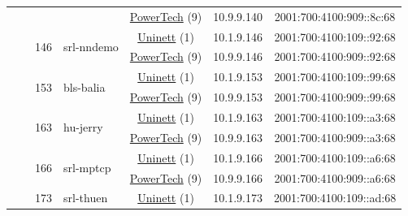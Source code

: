 \begin{small}
\begin{center}
\begin{longtable}{|c|c|c|c|c|c|c|c|}
  &  &  &  & \multicolumn{2}{|c|}{\tiny{\href{http://www.powertech.no}{PowerTech} (9)}} & \tiny{10.9.9.140} & \tiny{2001:700:4100:909::8c:68} \\* \cline{3-3}\cline{4-4}\cline{5-5}\cline{6-6}\cline{7-7}\cline{8-8}
  &  & \multirow{2}{*}{\tiny{146}} & \multicolumn{1}{|l|}{\multirow{2}{*}{\tiny{srl-nndemo}}} & \multicolumn{2}{|c|}{\tiny{\href{https://www.uninett.no}{Uninett} (1)}} & \tiny{10.1.9.146} & \tiny{2001:700:4100:109::92:68} \\* \cline{5-5}\cline{6-6}\cline{7-7}\cline{8-8}
  &  &  &  & \multicolumn{2}{|c|}{\tiny{\href{http://www.powertech.no}{PowerTech} (9)}} & \tiny{10.9.9.146} & \tiny{2001:700:4100:909::92:68} \\* \cline{3-3}\cline{4-4}\cline{5-5}\cline{6-6}\cline{7-7}\cline{8-8}
  &  & \multirow{2}{*}{\tiny{153}} & \multicolumn{1}{|l|}{\multirow{2}{*}{\tiny{bls-balia}}} & \multicolumn{2}{|c|}{\tiny{\href{https://www.uninett.no}{Uninett} (1)}} & \tiny{10.1.9.153} & \tiny{2001:700:4100:109::99:68} \\* \cline{5-5}\cline{6-6}\cline{7-7}\cline{8-8}
  &  &  &  & \multicolumn{2}{|c|}{\tiny{\href{http://www.powertech.no}{PowerTech} (9)}} & \tiny{10.9.9.153} & \tiny{2001:700:4100:909::99:68} \\* \cline{3-3}\cline{4-4}\cline{5-5}\cline{6-6}\cline{7-7}\cline{8-8}
  &  & \multirow{2}{*}{\tiny{163}} & \multicolumn{1}{|l|}{\multirow{2}{*}{\tiny{hu-jerry}}} & \multicolumn{2}{|c|}{\tiny{\href{https://www.uninett.no}{Uninett} (1)}} & \tiny{10.1.9.163} & \tiny{2001:700:4100:109::a3:68} \\* \cline{5-5}\cline{6-6}\cline{7-7}\cline{8-8}
  &  &  &  & \multicolumn{2}{|c|}{\tiny{\href{http://www.powertech.no}{PowerTech} (9)}} & \tiny{10.9.9.163} & \tiny{2001:700:4100:909::a3:68} \\* \cline{3-3}\cline{4-4}\cline{5-5}\cline{6-6}\cline{7-7}\cline{8-8}
  &  & \multirow{2}{*}{\tiny{166}} & \multicolumn{1}{|l|}{\multirow{2}{*}{\tiny{srl-mptcp}}} & \multicolumn{2}{|c|}{\tiny{\href{https://www.uninett.no}{Uninett} (1)}} & \tiny{10.1.9.166} & \tiny{2001:700:4100:109::a6:68} \\* \cline{5-5}\cline{6-6}\cline{7-7}\cline{8-8}
  &  &  &  & \multicolumn{2}{|c|}{\tiny{\href{http://www.powertech.no}{PowerTech} (9)}} & \tiny{10.9.9.166} & \tiny{2001:700:4100:909::a6:68} \\* \cline{3-3}\cline{4-4}\cline{5-5}\cline{6-6}\cline{7-7}\cline{8-8}
  &  & \multirow{2}{*}{\tiny{173}} & \multicolumn{1}{|l|}{\multirow{2}{*}{\tiny{srl-thuen}}} & \multicolumn{2}{|c|}{\tiny{\href{https://www.uninett.no}{Uninett} (1)}} & \tiny{10.1.9.173} & \tiny{2001:700:4100:109::ad:68} \\* \cline{5-5}\cline{6-6}\cline{7-7}\cline{8-8}

\end{longtable}
\end{center}
\end{small}
